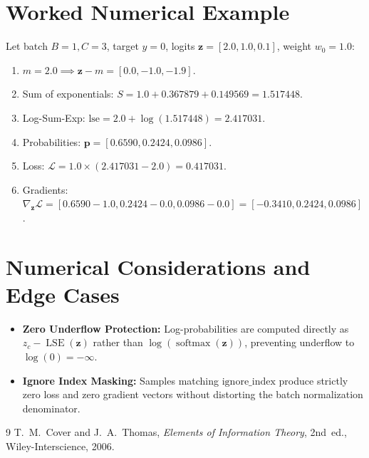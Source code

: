 \documentclass[11pt]{article}
\begin{document}
\section{Worked Numerical Example}
\label{sec:worked_example}

Let batch $B = 1, C = 3$, target $y = 0$, logits $\mathbf{z} = [2.0, 1.0, 0.1]$, weight $w_0 = 1.0$:
\begin{enumerate}
    \item $m = 2.0 \implies \mathbf{z} - m = [0.0, -1.0, -1.9]$.
    \item Sum of exponentials: $S = 1.0 + 0.367879 + 0.149569 = 1.517448$.
    \item Log-Sum-Exp: $\mathrm{lse} = 2.0 + \log(1.517448) = 2.417031$.
    \item Probabilities: $\mathbf{p} = [0.6590, 0.2424, 0.0986]$.
    \item Loss: $\mathcal{L} = 1.0 \times (2.417031 - 2.0) = 0.417031$.
    \item Gradients: $\nabla_{\mathbf{z}} \mathcal{L} = [0.6590 - 1.0, 0.2424 - 0.0, 0.0986 - 0.0] = [-0.3410, 0.2424, 0.0986]$.
\end{enumerate}

\section{Numerical Considerations and Edge Cases}
\label{sec:numerical}

\begin{itemize}
    \item \textbf{Zero Underflow Protection:} Log-probabilities are computed directly as $z_c - \operatorname{LSE}(\mathbf{z})$ rather than $\log(\operatorname{softmax}(\mathbf{z}))$, preventing underflow to $\log(0) = -\infty$.
    \item \textbf{Ignore Index Masking:} Samples matching $\mathrm{ignore\_index}$ produce strictly zero loss and zero gradient vectors without distorting the batch normalization denominator.
\end{itemize}

\begin{thebibliography}{9}
 T.~M.~Cover and J.~A.~Thomas, \emph{Elements of Information Theory}, 2nd~ed., Wiley-Interscience, 2006.
\end{thebibliography}
\end{document}
